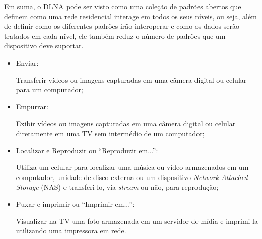 Em suma, o DLNA pode ser visto como uma coleção de padrões abertos que definem como uma rede residencial interage em todos os seus níveis, ou seja, além de definir como os diferentes padrões irão interoperar e como os dados serão tratados em cada nível, ele também reduz o número de padrões que um dispositivo deve suportar.

\begin{itemize}
       \item Enviar: 

       Transferir vídeos ou imagens capturadas em uma câmera digital ou celular para um computador;
       \item Empurrar: 

       Exibir vídeos ou imagens capturadas em uma câmera digital ou celular diretamente em uma TV sem intermédio de um computador;
       \item Localizar e Reproduzir ou ``Reproduzir em...'': 

       Utiliza um celular para localizar uma música ou vídeo armazenados em um computador, unidade de disco externa ou um dispositivo \emph{Network-Attached Storage} (NAS) e transferi-lo, via \emph{stream} ou não, para reprodução;
       \item Puxar e imprimir ou ``Imprimir em...'': 

       Visualizar na TV uma foto armazenada em um servidor de mídia e imprimi-la utilizando uma impressora em rede.
\end{itemize}


